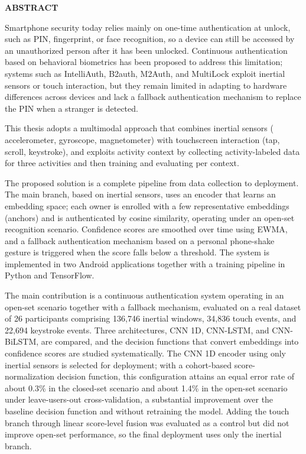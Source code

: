 \documentclass[../DoAn.tex]{subfiles}
\begin{document}
\begin{center}
    \Large{\textbf{ABSTRACT}}\\
\end{center}
\vspace{1cm}
Smartphone security today relies mainly on one-time authentication at unlock, such as PIN, fingerprint, or face recognition, so a device can still be accessed by an unauthorized person after it has been unlocked. Continuous authentication based on behavioral biometrics has been proposed to address this limitation; systems such as IntelliAuth, B2auth, M2Auth, and MultiLock exploit inertial sensors or touch interaction, but they remain limited in adapting to hardware differences across devices and lack a fallback authentication mechanism to replace the PIN when a stranger is detected.

This thesis adopts a multimodal approach that combines inertial sensors (\\
accelerometer, gyroscope, magnetometer) with touchscreen interaction (tap, scroll, keystroke), and exploits activity context by collecting activity-labeled data for three activities and then training and evaluating per context.

The proposed solution is a complete pipeline from data collection to deployment. The main branch, based on inertial sensors, uses an encoder that learns an embedding space; each owner is enrolled with a few representative embeddings (anchors) and is authenticated by cosine similarity, operating under an open-set recognition scenario. Confidence scores are smoothed over time using EWMA, and a fallback authentication mechanism based on a personal phone-shake gesture is triggered when the score falls below a threshold. The system is implemented in two Android applications together with a training pipeline in Python and TensorFlow.

The main contribution is a continuous authentication system operating in an open-set scenario together with a fallback mechanism, evaluated on a real dataset of 26 participants comprising 136{,}746 inertial windows, 34{,}836 touch events, and 22{,}694 keystroke events. Three architectures, CNN 1D, CNN-LSTM, and CNN-BiLSTM, are compared, and the decision functions that convert embeddings into confidence scores are studied systematically. The CNN 1D encoder using only inertial sensors is selected for deployment; with a cohort-based score-normalization decision function, this configuration attains an equal error rate of about 0.3\% in the closed-set scenario and about 1.4\% in the open-set scenario under leave-users-out cross-validation, a substantial improvement over the baseline decision function and without retraining the model. Adding the touch branch through linear score-level fusion was evaluated as a control but did not improve open-set performance, so the final deployment uses only the inertial branch.
\end{document}

